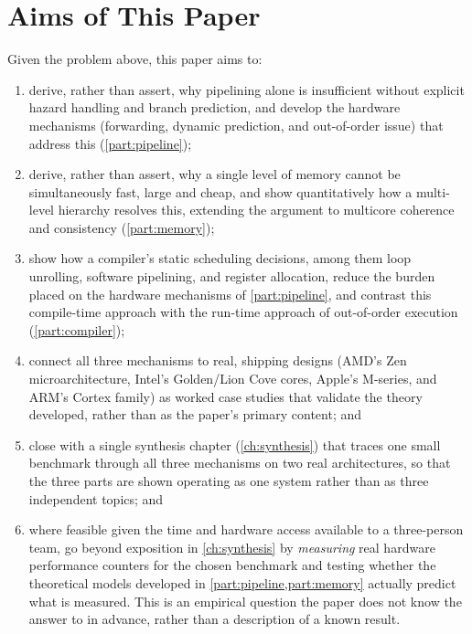 \documentclass[11pt,a4paper]{report}
\begin{document}
\section{Aims of This Paper}
\label{sec:aims}

Given the problem above, this paper aims to:
\begin{enumerate}[leftmargin=*]
  \item derive, rather than assert, why pipelining alone is insufficient
    without explicit hazard handling and branch prediction, and develop
    the hardware mechanisms (forwarding, dynamic prediction, and
    out-of-order issue) that address this (\cref{part:pipeline});
  \item derive, rather than assert, why a single level of memory cannot
    be simultaneously fast, large and cheap, and show quantitatively how
    a multi-level hierarchy resolves this, extending the argument to
    multicore coherence and consistency (\cref{part:memory});
  \item show how a compiler's static scheduling decisions, among them
    loop unrolling, software pipelining, and register allocation, reduce
    the burden placed on the hardware mechanisms of \cref{part:pipeline},
    and contrast this compile-time approach with the run-time approach of
    out-of-order execution (\cref{part:compiler});
  \item connect all three mechanisms to real, shipping designs (AMD's
    Zen microarchitecture, Intel's Golden/Lion Cove cores, Apple's
    M-series, and ARM's Cortex family) as worked case studies that
    validate the theory developed, rather than as the paper's primary
    content; and
  \item close with a single synthesis chapter (\cref{ch:synthesis}) that
    traces one small benchmark through all three mechanisms on two real
    architectures, so that the three parts are shown operating as one
    system rather than as three independent topics; and
  \item where feasible given the time and hardware access available to a
    three-person team, go beyond exposition in \cref{ch:synthesis} by
    \emph{measuring} real hardware performance counters for the chosen
    benchmark and testing whether the theoretical models developed in
    \cref{part:pipeline,part:memory} actually predict what is measured.
    This is an empirical question the paper does not know the answer to
    in advance, rather than a description of a known result.
\end{enumerate}
\end{document}
